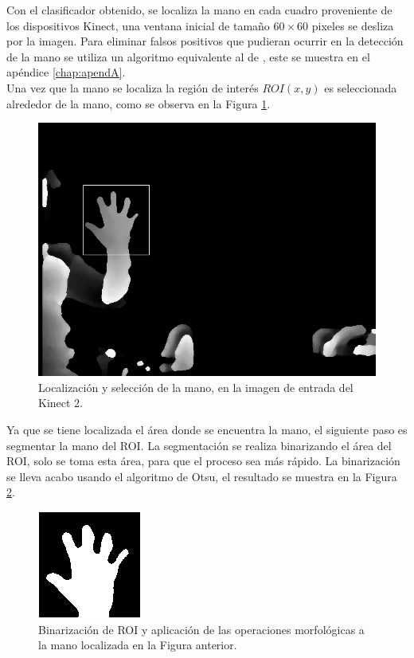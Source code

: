 Con el clasificador obtenido, se localiza la mano en cada cuadro proveniente de los dispositivos  Kinect, una ventana  inicial de tamaño $60 \times 60$ pixeles se desliza por la imagen. Para eliminar falsos positivos que pudieran ocurrir en la detección de la mano se utiliza un algoritmo equivalente al de \cite{Mei2015}, este se muestra en el apéndice \ref{chap:apendA}.\\ 
Una vez que la mano se localiza la región de interés $ROI(x,y)$ es seleccionada alrededor de la mano, como se observa en la Figura \ref{fig:Roi}.

\begin{figure}[h!]
\begin{center}
\includegraphics[scale=.35]{./Figures/DS_252.png}
\end{center}
\caption{Localización y selección de la mano, en la imagen de entrada del Kinect 2.}
\label{fig:Roi}
\end{figure}  

Ya que se tiene localizada el área donde se encuentra la mano, el siguiente paso es segmentar la mano del ROI. La segmentación se realiza binarizando el área del ROI, solo se toma esta área, para que el proceso sea más rápido. La binarizaci\'on se lleva acabo usando el algoritmo de Otsu, el resultado se muestra en la Figura \ref{fig:BinarizationRoi}. 
  
\begin{figure}[h!]
\begin{center}
\includegraphics[scale=1]{./Figures/250B_Otsu.png}
\end{center}
\caption{Binarización de ROI y aplicación de las operaciones morfológicas a la mano localizada en la Figura anterior.}
\label{fig:BinarizationRoi}
\end{figure} 

